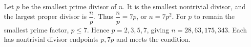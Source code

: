 Let $p$ be the smallest prime divisor of $n$. It is the smallest nontrivial divisor, and the largest proper divisor is $\dfrac{n}{p}$. Thus $\dfrac{n}{p}=7p$, or $n=7p^2$. For $p$ to remain the smallest prime factor, $p\le7$. Hence $p=2,3,5,7$, giving $\boxed{n=28,63,175,343}$. Each has nontrivial divisor endpoints $p,7p$ and meets the condition.
